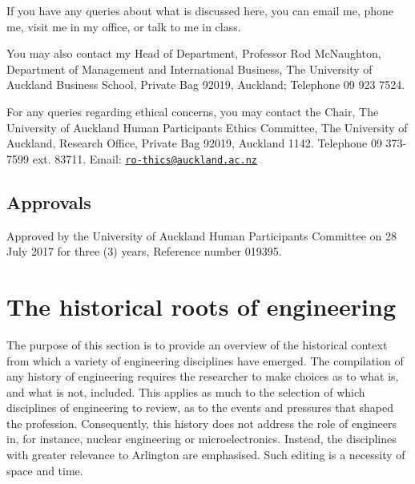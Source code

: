 \documentclass[]{book}
\theoremstyle{definition}
\theoremstyle{definition}
\theoremstyle{definition}
\theoremstyle{remark}
\begin{document}
If you have any queries about what is discussed here, you can email me,
phone me, visit me in my office, or talk to me in class.

You may also contact my Head of Department, Professor Rod McNaughton,
Department of Management and International Business, The University of
Auckland Business School, Private Bag 92019, Auckland; Telephone 09 923
7524.

For any queries regarding ethical concerns, you may contact the Chair,
The University of Auckland Human Participants Ethics Committee, The
University of Auckland, Research Office, Private Bag 92019, Auckland
1142. Telephone 09 373-7599 ext. 83711. Email:
\href{mailto:ro-thics@auckland.ac.nz}{\nolinkurl{ro-thics@auckland.ac.nz}}

\hypertarget{approvals}{%
\section{Approvals}\label{approvals}}

Approved by the University of Auckland Human Participants Committee on
28 July 2017 for three (3) years, Reference number 019395.

\hypertarget{engineering}{%
\chapter{The historical roots of engineering}\label{engineering}}

The purpose of this section is to provide an overview of the historical
context from which a variety of engineering disciplines have emerged.
The compilation of any history of engineering requires the researcher to
make choices as to what is, and what is not, included. This applies as
much to the selection of which disciplines of engineering to review, as
to the events and pressures that shaped the profession. Consequently,
this history does not address the role of engineers in, for instance,
nuclear engineering or microelectronics. Instead, the disciplines with
greater relevance to Arlington are emphasised. Such editing is a
necessity of space and time.
\end{document}
